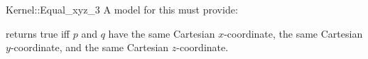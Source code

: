 \begin{ccRefFunctionObjectConcept}{Kernel::Equal_xyz_3}
A model for this must provide:


{returns true iff $p$ and $q$ have the same Cartesian $x$-coordinate, 
the same Cartesian $y$-coordinate, and the same Cartesian $z$-coordinate.}

\end{ccRefFunctionObjectConcept}
